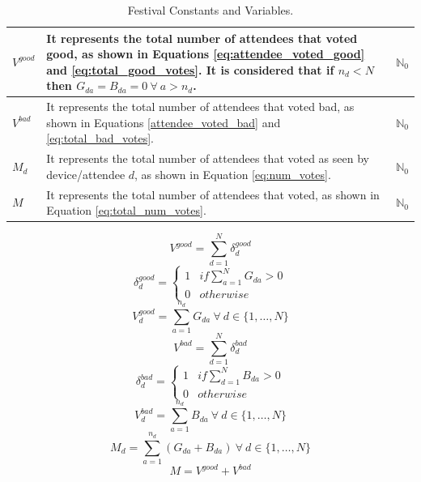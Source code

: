 \begin{table}[!ht]
\begin{tabular}{|p{.5cm}|p{5.7cm}|r| }
		\hline
			$V^{good}$ & It represents the total number of attendees that voted good, as shown in Equations  \ref{eq:attendee_voted_good} and \ref{eq:total_good_votes}. It is considered that if $n_{d} < N$ then $G_{da} = B_{da} = 0 ~ \forall ~ a > n_{d}$. & $\mathbb{N}_{0}$ \\
		\hline
			$V^{bad}$ & It represents the total number of attendees that voted bad, as shown in Equations \ref{attendee_voted_bad} and \ref{eq:total_bad_votes}. & $\mathbb{N}_{0}$ \\
		\hline
			$M_{d}$ & It represents the total number of attendees that voted as seen by device/attendee $d$, as shown in Equation \ref{eq:num_votes}. & $\mathbb{N}_{0}$ \\
		\hline
			$M$ & It represents the total number of attendees that voted, as shown in Equation \ref{eq:total_num_votes}. & $\mathbb{N}_{0}$ \\
		\hline
	\end{tabular}
			
	\caption{Festival Constants and Variables.}
	\label{tab:festival_constants_variables}
\end{table}
\begin{equation} \label{eq:total_good_votes}
	V^{good}  = \sum^{N}_{d=1} \delta^{good}_{d}
\end{equation}
\begin{equation} \label{eq:attendee_voted_good}
	\delta^{good}_{d} = \left\{\begin{array}{ll}
			1 & if \sum^{N}_{a=1} G_{da} > 0\\
			0 & otherwise
		\end{array}
	\right.
\end{equation}
\begin{equation} \label{eq:local_total_good_votes}
	V^{good}_{d}  = \sum^{n_{d}}_{a=1} G_{da} ~ \forall ~ d \in \{1,\dots, N\}
\end{equation}
\begin{equation} \label{eq:total_bad_votes}
	V^{bad}  = \sum^{N}_{d=1} \delta^{bad}_{d}
\end{equation}
\begin{equation} \label{attendee_voted_bad}
	\delta^{bad}_{d} = \left\{\begin{array}{ll}
			1 & if \sum^{N}_{d=1} B_{da} > 0\\
			0 & otherwise
		\end{array}
	\right.
\end{equation}
\begin{equation} \label{eq:local_total_bad_votes}
	V^{bad}_{d}  = \sum^{n_{d}}_{a=1} B_{da} ~ \forall ~ d \in \{1,\dots, N\}
\end{equation}
\begin{equation} \label{eq:num_votes}
	M_{d}  = \sum^{n_{d}}_{a=1} (G_{da} + B_{da}) ~ \forall ~ d \in \{1,\dots, N\}
\end{equation}
\begin{equation} \label{eq:total_num_votes}
M  = V^{good} + V^{bad}
\end{equation}

